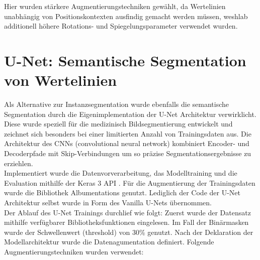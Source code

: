 Hier wurden stärkere Augmentierungstechniken gewählt, da Wertelinien unabhängig von Positionskontexten ausfindig gemacht werden müssen, weshlab additionell höhere Rotations- und Spiegelungsparameter verwendet wurden.


\section{U-Net: Semantische Segmentation von Wertelinien}
\label{ch:unet}

Als Alternative zur Instanzsegmentation wurde ebenfalls die semantische Segmentation durch die Eigenimplementation der U-Net Architektur verwirklicht. Diese wurde speziell für die medizinisch Bildsegmentierung entwickelt und zeichnet sich besonders bei einer limitierten Anzahl von Trainingsdaten aus. Die Architektur des CNNs (convolutional neural network) kombiniert Encoder- und Decoderpfade mit Skip-Verbindungen um so präzise Segmentationsergebnisse zu erziehlen.
\\
Implementiert wurde die Datenvorverarbeitung, das Modelltraining und die Evaluation mithilfe der Keras 3 API \cite{chollet2015keras}. Für die Augmentierung der Trainingsdaten wurde die Bibliothek Albumentations \cite{info11020125} genutzt. Lediglich der Code der U-Net Architektur selbst wurde in Form des Vanilla U-Nets \cite{zak2024kerasunet} übernommen.
\\
Der Ablauf des U-Net Trainings durchlief wie folgt:
Zuerst wurde der Datensatz mithilfe verfügbarer Bibliotheksfunktionen eingelesen. Im Fall der Binärmasken wurde der Schwellenwert (threshold) von 30\% genutzt. Nach der Deklaration der Modellarchitektur wurde die Datenagumentation definiert. Folgende Augmentierungstechniken wurden verwendet:

